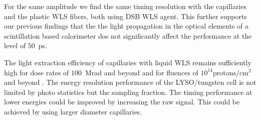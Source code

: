 For the same amplitude we find the same timing resolution with the capillaries and the plastic WLS fibers, both using DSB WLS agent.
This further supports our previous findings that the the light propagation in the optical elements of a 
scintillation based calorimeter dos not significantly affect the performance at the level of $50$~ps.

The light extraction efficiency of capillaries with liquid WLS remains sufficiently high for dose rates of $100$~Mrad and beyond 
and for fluences of $\mathrm{10^{14} protons/cm^{2}}$ and beyond \cite{shashlik2}. The energy resolution performance of 
the LYSO/tungsten cell is not limited by photo statistics but the sampling fraction. The timing performance at lower 
energies could be improved by increasing the raw signal. This could be achieved by using larger diameter capillaries.\\ 

